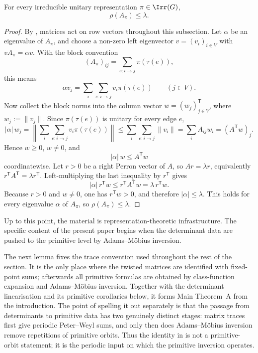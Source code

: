 \begin{proposition}
  \label{prop:twisted-spectral-radius-bound}
  For every irreducible unitary representation
  \(\pi\in\Irr(G)\),
  \[
    \rho(A_\pi)\le \lambda.
  \]
\end{proposition}

\begin{proof}
  By , matrices act
  on row vectors throughout this subsection. Let \(\alpha\) be an
  eigenvalue of \(A_\pi\), and choose a non-zero left eigenvector
  \(v=(v_i)_{i\in V}\) with
  \(vA_\pi=\alpha v\). With the block convention
  \[
    (A_\pi)_{ij}=\sum_{e:i\to j}\pi(\tau(e)),
  \]
  this means
  \[
    \alpha v_j
    =
    \sum_i\sum_{e:i\to j}v_i\pi(\tau(e))
    \qquad (j\in V).
  \]
  Now collect the block norms into the column vector
  \(w=(w_j)_{j\in V}^{\mathsf T}\), where \(w_j:=\|v_j\|\). Since
  \(\pi(\tau(e))\) is unitary for every edge \(e\),
  \[
    |\alpha|\,w_j
    =
    \left\|\sum_i\sum_{e:i\to j}v_i\pi(\tau(e))\right\|
    \le \sum_i\sum_{e:i\to j}\|v_i\|
    =\sum_i A_{ij}w_i
    =(A^{\mathsf T}w)_j.
  \]
  Hence \(w\ge 0\), \(w\neq 0\), and
  \[
    |\alpha|\,w\le A^{\mathsf T}w
  \]
  coordinatewise. Let \(r>0\) be a right Perron vector of \(A\), so
  \(Ar=\lambda r\), equivalently
  \(r^{\mathsf T}A^{\mathsf T}=\lambda r^{\mathsf T}\). Left-multiplying
  the last inequality by \(r^{\mathsf T}\) gives
  \[
    |\alpha|\,r^{\mathsf T}w
    \le
    r^{\mathsf T}A^{\mathsf T}w
    =
    \lambda\,r^{\mathsf T}w.
  \]
  Because \(r>0\) and \(w\neq 0\), one has \(r^{\mathsf T}w>0\), and
  therefore \(|\alpha|\le \lambda\). This holds for every eigenvalue
  \(\alpha\) of \(A_\pi\), so \(\rho(A_\pi)\le \lambda\).
\end{proof}

\noindent
Up to this point, the material is representation-theoretic
infrastructure. The specific content of the present paper begins when
the determinant data are pushed to the primitive level by
Adams--M\"obius inversion.

The next lemma fixes the trace convention used throughout the rest of
the section. It is the only place where the twisted matrices are
identified with fixed-point sums; afterwards all primitive formulas are
obtained by class-function expansion and Adams--M\"obius inversion.
Together with the determinant linearisation and its primitive
corollaries below, it forms Main Theorem~A from the introduction.
The point of spelling it out separately is that the passage from
determinants to primitive data has two genuinely distinct stages:
matrix traces first give periodic Peter--Weyl sums, and only then does
Adams--M\"obius inversion remove repetitions of primitive orbits.
Thus the identity in  is not a
primitive-orbit statement; it is the periodic input on which the
primitive inversion operates.

